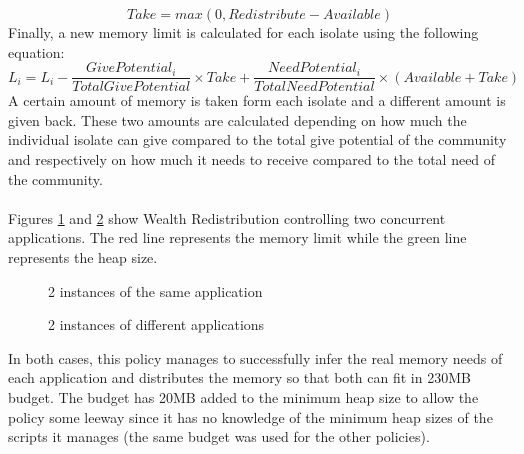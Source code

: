 \documentclass{l4proj}
\begin{document}
\begin{equation}
\textit{Take} = max(0,\textit{Redistribute} - \textit{Available})
\end{equation}
Finally, a new memory limit is calculated for each isolate using the following equation:
\begin{equation}
L_i = L_i - \dfrac{\textit{GivePotential}_i}{\textit{TotalGivePotential}} \times Take + \dfrac{\textit{NeedPotential}_i}{\textit{TotalNeedPotential}}\times \left(Available + Take\right) 
\end{equation}
A certain amount of memory is taken form each isolate and a different amount is given back. These two amounts are calculated depending on how much the individual isolate can give compared to the total give potential of the community and respectively on how much it needs to receive compared to the total need of the community.
\\\\
Figures \ref{wrd_eq} and \ref{wrd_df} show Wealth Redistribution controlling two concurrent applications. The red line represents the memory limit while the green line represents the heap size.
\begin{figure}[!ht]
\caption{2 instances of the same application}
\label{wrd_eq}
\end{figure}
\begin{figure}[!ht]
\caption{2 instances of different applications}
\label{wrd_df}
\end{figure}
\newpage
In both cases, this policy manages to successfully infer the real memory needs of each application and distributes the memory so that both can fit in 230MB budget. The budget has 20MB added to the minimum heap size to allow the policy some leeway since it has no knowledge of the minimum heap sizes of the scripts it manages (the same budget was used for the other policies).
\end{document}
